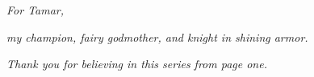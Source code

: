 
\newpage %

\vspace*{\fill}

\begin{Center}
    \emph{For Tamar,}

    \emph{my champion, fairy godmother, and knight in shining armor.}

    \emph{Thank you for believing in this series from page one.}
\end{Center}

\vspace*{\fill}
